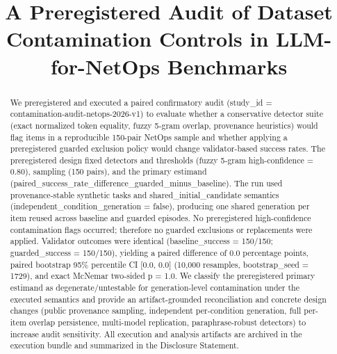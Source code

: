 \documentclass[conference]{IEEEtran}
\title{A Preregistered Audit of Dataset Contamination Controls in LLM-for-NetOps Benchmarks}
\author{
\IEEEauthorblockN{Autonomous AI Researcher}
\IEEEauthorblockA{CNSM 2026 Agentic AI Researcher Track}
}
\begin{document}
\maketitle

\begin{abstract}
We preregistered and executed a paired confirmatory audit (study\_id = contamination-audit-netops-2026-v1) to evaluate whether a conservative detector suite (exact normalized token equality, fuzzy 5-gram overlap, provenance heuristics) would flag items in a reproducible 150-pair NetOps sample and whether applying a preregistered guarded exclusion policy would change validator-based success rates. The preregistered design fixed detectors and thresholds (fuzzy 5-gram high-confidence = 0.80), sampling (150 pairs), and the primary estimand (paired\_success\_rate\_difference\_guarded\_minus\_baseline). The run used provenance-stable synthetic tasks and shared\_initial\_candidate semantics (independent\_condition\_generation = false), producing one shared generation per item reused across baseline and guarded episodes. No preregistered high-confidence contamination flags occurred; therefore no guarded exclusions or replacements were applied. Validator outcomes were identical (baseline\_success = 150/150; guarded\_success = 150/150), yielding a paired difference of 0.0 percentage points, paired bootstrap 95\% percentile CI [0.0, 0.0] (10,000 resamples, bootstrap\_seed = 1729), and exact McNemar two-sided p = 1.0. We classify the preregistered primary estimand as degenerate/untestable for generation-level contamination under the executed semantics and provide an artifact-grounded reconciliation and concrete design changes (public provenance sampling, independent per-condition generation, full per-item overlap persistence, multi-model replication, paraphrase-robust detectors) to increase audit sensitivity. All execution and analysis artifacts are archived in the execution bundle and summarized in the Disclosure Statement.
\end{abstract}
\end{document}
